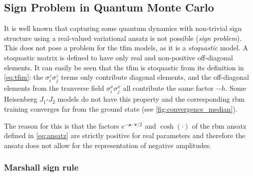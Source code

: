\documentclass[10pt,a4paper]{article}
\numberwithin{equation}{section}
\begin{document}
\subsection{Sign Problem in Quantum Monte Carlo}
It is well known that capturing some quantum dynamics with non-trivial sign structure using a real-valued variational ansatz is not possible (\textit{sign problem})\cite{Troyer_2005}. This does not pose a problem for the \gls{tfim} models, as it is a \textit{stoquastic} model\cite{2011772.2011773}. A stoquastic matrix is defined to have only real and non-positive off-diagonal elements. It can easily be seen that the \gls{tfim} is stoquastic from its definition in  \autoref{eq:tfim}: the $\sigma^z_i\sigma^z_j$ terms only contribute diagonal elements, and the off-diagonal elements from the tranverse field $\sigma^x_i\sigma^x_j$ all contribute the same factor $-h$. Some Heisenberg $J_1$-$J_2$ models do not have this property and the corresponding \gls{rbm} training converges far from the ground state (see \autoref{fig:convergence_median}). 

The reason for this is that the factors  $e^{-\mathbf{a}\cdot\mathbf{v}/2}$ and $\cosh(\cdot)$ of the \gls{rbm} ansatz defined in \autoref{eq:ansatz} are strictly positive for real parameters and therefore the ansatz does not allow for the representation of negative amplitudes\cite{Carleo_2017}.
\subsubsection{Marshall sign rule}
\label{sec:marshall}
\end{document}
